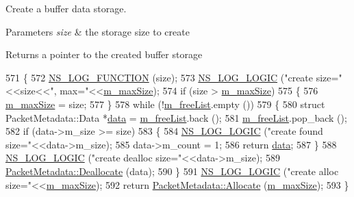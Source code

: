Create a buffer data storage. 


\begin{DoxyParams}{Parameters}
{\em size} & the storage size to create \\
\hline
\end{DoxyParams}
\begin{DoxyReturn}{Returns}
a pointer to the created buffer storage 
\end{DoxyReturn}

\begin{DoxyCode}
571 \{
572   \hyperlink{log-macros-disabled_8h_a90b90d5bad1f39cb1b64923ea94c0761}{NS\_LOG\_FUNCTION} (size);
573   \hyperlink{group__logging_ga88acd260151caf2db9c0fc84997f45ce}{NS\_LOG\_LOGIC} (\textcolor{stringliteral}{"create size="}<<size<<\textcolor{stringliteral}{", max="}<<\hyperlink{classns3_1_1PacketMetadata_a3816d0a0ab763831fd248b0b2693db1c}{m\_maxSize});
574   \textcolor{keywordflow}{if} (size > \hyperlink{classns3_1_1PacketMetadata_a3816d0a0ab763831fd248b0b2693db1c}{m\_maxSize})
575     \{
576       \hyperlink{classns3_1_1PacketMetadata_a3816d0a0ab763831fd248b0b2693db1c}{m\_maxSize} = size;
577     \}
578   \textcolor{keywordflow}{while} (!\hyperlink{classns3_1_1PacketMetadata_aa646ed601542eec6bb98e6219165a7c8}{m\_freeList}.empty ()) 
579     \{
580       \textcolor{keyword}{struct }PacketMetadata::Data *\hyperlink{topology-example-sim_8cc_a26c65296e316af77b787dc77469bb2a4}{data} = \hyperlink{classns3_1_1PacketMetadata_aa646ed601542eec6bb98e6219165a7c8}{m\_freeList}.back ();
581       \hyperlink{classns3_1_1PacketMetadata_aa646ed601542eec6bb98e6219165a7c8}{m\_freeList}.pop\_back ();
582       \textcolor{keywordflow}{if} (data->m\_size >= size) 
583         \{
584           \hyperlink{group__logging_ga88acd260151caf2db9c0fc84997f45ce}{NS\_LOG\_LOGIC} (\textcolor{stringliteral}{"create found size="}<<data->m\_size);
585           data->m\_count = 1;
586           \textcolor{keywordflow}{return} \hyperlink{topology-example-sim_8cc_a26c65296e316af77b787dc77469bb2a4}{data};
587         \}
588       \hyperlink{group__logging_ga88acd260151caf2db9c0fc84997f45ce}{NS\_LOG\_LOGIC} (\textcolor{stringliteral}{"create dealloc size="}<<data->m\_size);
589       \hyperlink{classns3_1_1PacketMetadata_a5284ea0e3b7e0e272ca521cb976431b7}{PacketMetadata::Deallocate} (data);
590     \}
591   \hyperlink{group__logging_ga88acd260151caf2db9c0fc84997f45ce}{NS\_LOG\_LOGIC} (\textcolor{stringliteral}{"create alloc size="}<<\hyperlink{classns3_1_1PacketMetadata_a3816d0a0ab763831fd248b0b2693db1c}{m\_maxSize});
592   \textcolor{keywordflow}{return} \hyperlink{classns3_1_1PacketMetadata_a5cb8aff27ae7a4b60c0bc1a743e1cc8a}{PacketMetadata::Allocate} (\hyperlink{classns3_1_1PacketMetadata_a3816d0a0ab763831fd248b0b2693db1c}{m\_maxSize});
593 \}
\end{DoxyCode}


